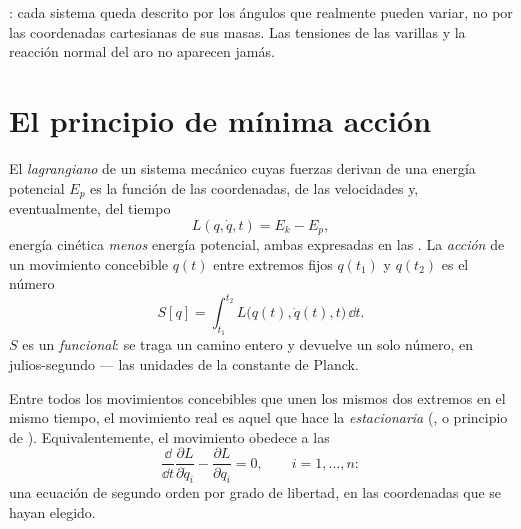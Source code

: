 \begin{omfigure}
{\small {}: cada sistema queda descrito por los
ángulos que realmente pueden variar, no por las coordenadas cartesianas de
sus masas. Las tensiones de las varillas y la reacción normal del aro no
aparecen jamás.}
\end{omfigure}

\section{El principio de mínima acción}

\begin{definition}\label{def:b3:lagrangian-mechanics:action}
El \emph{lagrangiano} de un sistema mecánico cuyas fuerzas derivan de una
energía potencial $E_p$ es la función de las coordenadas, de las velocidades
y, eventualmente, del tiempo
\[
L(q, \dot q, t) = E_k - E_p ,
\]
energía cinética \emph{menos} energía potencial, ambas expresadas en las
. La \emph{acción} de un movimiento concebible
$q(t)$ entre extremos fijos $q(t_1)$ y $q(t_2)$ es el número
\[
S[q] = \int_{t_1}^{t_2} L\big(q(t), \dot q(t), t\big)\,\dd t .
\]
$S$ es un \emph{funcional}: se traga un camino entero y devuelve un solo
número, en julios-segundo --- las unidades de la constante de Planck.
\end{definition}

\begin{theorem}\label{thm:b3:lagrangian-mechanics:euler-lagrange}
Entre todos los movimientos concebibles que unen los mismos dos extremos en
el mismo tiempo, el movimiento real es aquel que hace la 
\emph{estacionaria} (\emph{}, o principio de
\emph{}). Equivalentemente, el movimiento obedece a las
\emph{}
\[
\frac{\dd}{\dd t}\frac{\partial L}{\partial\dot q_i}
 - \frac{\partial L}{\partial q_i} = 0 ,
\qquad i = 1, \dots, n :
\]
una ecuación de segundo orden por grado de libertad, en las coordenadas que
se hayan elegido.
\end{theorem}

